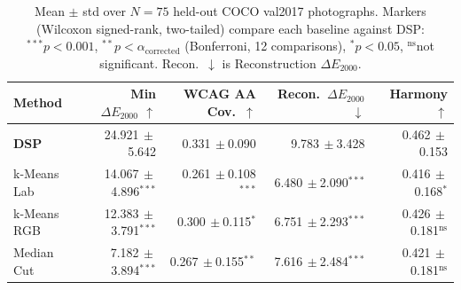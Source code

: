 \begin{table}[htbp]
\centering
\caption{Mean $\pm$ std over $N=75$ held-out COCO val2017 photographs. Markers (Wilcoxon signed-rank, two-tailed) compare each baseline against DSP: $^{***}p<0.001$, $^{**}p<\alpha_{\mathrm{corrected}}$ (Bonferroni, 12 comparisons), $^*p<0.05$, $^{\mathrm{ns}}$not significant. Recon.\ $\downarrow$ is Reconstruction $\Delta E_{2000}$.}
\label{tab:aggregate_metrics}
\setlength{\tabcolsep}{5pt}
\begin{tabular}{lrrrr}
\hline\hline
Method & Min $\Delta E_{2000}$ $\uparrow$ & WCAG AA Cov.\ $\uparrow$ & Recon.\ $\Delta E_{2000}$ $\downarrow$ & Harmony $\uparrow$ \\
\hline
\textbf{DSP} & 24.921{\scriptsize$\,\pm$5.642} & 0.331{\scriptsize$\,\pm$0.090} & 9.783{\scriptsize$\,\pm$3.428} & 0.462{\scriptsize$\,\pm$0.153} \\
k-Means Lab & 14.067{\scriptsize$\,\pm$4.896}$^{\mathrm{***}}$ & 0.261{\scriptsize$\,\pm$0.108}$^{\mathrm{***}}$ & 6.480{\scriptsize$\,\pm$2.090}$^{\mathrm{***}}$ & 0.416{\scriptsize$\,\pm$0.168}$^{\mathrm{*}}$ \\
k-Means RGB & 12.383{\scriptsize$\,\pm$3.791}$^{\mathrm{***}}$ & 0.300{\scriptsize$\,\pm$0.115}$^{\mathrm{*}}$ & 6.751{\scriptsize$\,\pm$2.293}$^{\mathrm{***}}$ & 0.426{\scriptsize$\,\pm$0.181}$^{\mathrm{ns}}$ \\
Median Cut & 7.182{\scriptsize$\,\pm$3.894}$^{\mathrm{***}}$ & 0.267{\scriptsize$\,\pm$0.155}$^{\mathrm{**}}$ & 7.616{\scriptsize$\,\pm$2.484}$^{\mathrm{***}}$ & 0.421{\scriptsize$\,\pm$0.181}$^{\mathrm{ns}}$ \\
\hline\hline
\end{tabular}
\end{table}
